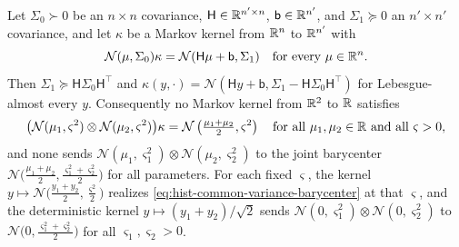Let $\Sigma_0\succ0$ be an $n\times n$ covariance, $\mathsf H\in\mathbb R^{n'\times n}$,
$\mathsf b\in\mathbb R^{n'}$, and $\Sigma_1\succeq0$ an $n'\times n'$ covariance, and let $\kappa$ be
a Markov kernel from $\mathbb R^n$ to $\mathbb R^{n'}$ with
\begin{equation}
\mathcal N(\mu,\Sigma_0)\kappa=\mathcal N(\mathsf H\mu+\mathsf b,\Sigma_1)
\quad\text{for every }\mu\in\mathbb R^n.
\label{eq:hist-gaussian-location-image}
\end{equation}
Then $\Sigma_1\succeq\mathsf H\Sigma_0\mathsf H^\top$ and
$\kappa(y,\cdot)=\mathcal N(\mathsf Hy+\mathsf b,\Sigma_1-\mathsf H\Sigma_0\mathsf H^\top)$ for
Lebesgue-almost every $y$.  Consequently no Markov kernel from $\mathbb R^2$ to $\mathbb R$ satisfies
\begin{equation}
\bigl(\mathcal N(\mu_1,\varsigma^2)\otimes\mathcal N(\mu_2,\varsigma^2)\bigr)\kappa
=\mathcal N\left(\tfrac{\mu_1+\mu_2}{2},\varsigma^2\right)
\quad\text{for all }\mu_1,\mu_2\in\mathbb R\text{ and all }\varsigma>0,
\label{eq:hist-common-variance-barycenter}
\end{equation}
and none sends $\mathcal N(\mu_1,\varsigma_1^2)\otimes\mathcal N(\mu_2,\varsigma_2^2)$ to
the joint barycenter $\mathcal N\bigl(\tfrac{\mu_1+\mu_2}{2},\tfrac{\varsigma_1^2+
\varsigma_2^2}{2}\bigr)$ for all parameters.  For each fixed $\varsigma$, the kernel
$y\mapsto\mathcal N\bigl(\tfrac{y_1+y_2}{2},\tfrac{\varsigma^2}{2}\bigr)$ realizes
\eqref{eq:hist-common-variance-barycenter} at that $\varsigma$, and the deterministic
kernel $y\mapsto(y_1+y_2)/\sqrt2$ sends $\mathcal N(0,\varsigma_1^2)\otimes\mathcal
N(0,\varsigma_2^2)$ to $\mathcal N\bigl(0,\tfrac{\varsigma_1^2+\varsigma_2^2}{2}\bigr)$ for
all $\varsigma_1,\varsigma_2>0$.  

